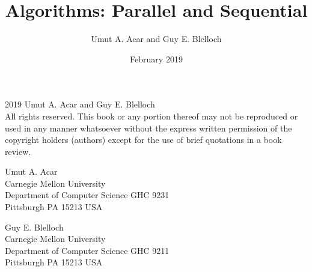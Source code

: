 \title{{Algorithms: Parallel and Sequential}}
\author{Umut A. Acar and Guy E. Blelloch}
\date{February 2019}
\hypersetup{pageanchor=false} 
\maketitle

\parindent 0pt
\parskip \baselineskip
\textcopyright{} 2019 Umut A. Acar and Guy E. Blelloch 
\\

All rights reserved.
This book or any portion thereof may not be reproduced or used in any
manner whatsoever without the express written permission of the
copyright holders (authors) except for the use of brief quotations in
a book review.

Umut A. Acar 
\\
Carnegie Mellon University 
\\
Department of Computer Science
GHC 9231
\\
Pittsburgh PA 15213 USA

Guy E. Blelloch
\\
Carnegie Mellon University 
\\
Department of Computer Science
GHC 9211
\\
Pittsburgh PA 15213 USA

\tableofcontents
\mainmatter
\hypersetup{pageanchor=true} 
